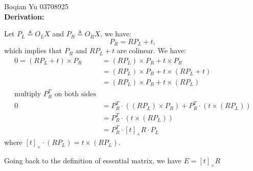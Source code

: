 \documentclass[a4paper, 12pt]{article}
\begin{document}
    Boqian Yu 03708925\\
	
    \textbf{Derivation:}
    
    Let $P_L \triangleq O_L X$ and $P_R \triangleq O_R X$, we have:
    $$P_R = R P_L + t,$$
    which implies that $P_R$ and $RP_L+t$ are colinear. We have:
    \begin{equation*}
    \begin{aligned}
        0 = (R P_L + t) \times P_R&= (R P_L) \times P_R + t \times P_R \\
         &= (RP_L) \times P_R + t \times (RP_L + t) \\
         &= (RP_L) \times P_R + t \times (RP_L) \\
        \text{multiply $P_R^T$ on both sides} \\
        0&= P_R^T \cdot \left((R P_L) \times P_R \right) + P_R^T \cdot \left( t \times (RP_L) \right) \\
         &= P_R^T \cdot \left( t \times (RP_L) \right) \\
         &= P_R^T \cdot [t]_{\times} R \cdot P_L
    \end{aligned}
    \end{equation*}
    where $[t]_{\times} \cdot (R P_L) = t \times (R P_L)$.
    
    Going back to the definition of essential matrix, we have $E = [t]_{\times}R$
\end{document}
